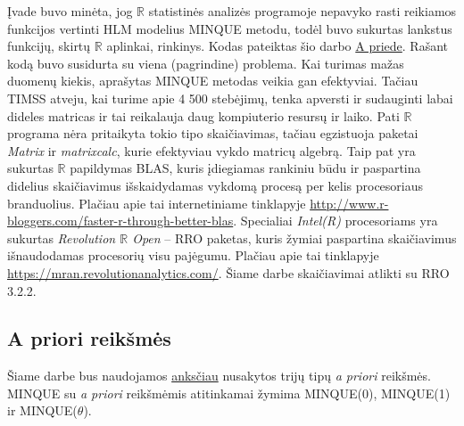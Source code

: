 \documentclass[11pt,a4paper]{article}
\newcommand{\R}{{\mathbb R}}
\begin{document}
\indent Įvade  buvo minėta, jog $\R$ statistinės analizės programoje nepavyko rasti reikiamos funkcijos vertinti HLM modelius MINQUE metodu, todėl buvo sukurtas lankstus funkcijų, skirtų $\R$ aplinkai, rinkinys. Kodas pateiktas šio darbo \hyperlink{appendixa}{A priede}. Rašant kodą buvo susidurta su viena (pagrindine) problema. Kai turimas mažas duomenų kiekis, aprašytas MINQUE metodas veikia gan efektyviai. Tačiau TIMSS atveju, kai turime apie 4 500 stebėjimų, tenka apversti ir sudauginti labai dideles matricas ir tai reikalauja daug kompiuterio resursų ir laiko. Pati $\R$ programa nėra pritaikyta tokio tipo skaičiavimas, tačiau egzistuoja paketai \textit{Matrix} ir \textit{matrixcalc}, kurie efektyviau vykdo matricų algebrą. Taip pat yra sukurtas $\R$ papildymas BLAS, kuris įdiegiamas rankiniu būdu ir paspartina didelius skaičiavimus išskaidydamas vykdomą procesą per kelis procesoriaus branduolius. Plačiau apie tai internetiniame tinklapyje \url{http://www.r-bloggers.com/faster-r-through-better-blas}. Specialiai \textit{Intel(R)} procesoriams yra sukurtas \textit{Revolution $\R$ Open} -- RRO paketas, kuris žymiai paspartina skaičiavimus išnaudodamas procesorių visu pajėgumu. Plačiau apie tai tinklapyje \url{https://mran.revolutionanalytics.com/}. Šiame darbe skaičiavimai atlikti su RRO 3.2.2.


\subsection{A priori reikšmės}\label{subsec:apriori}
\indent Šiame darbe bus naudojamos \hyperlink{apriori}{anksčiau} nusakytos trijų tipų \textit{a priori} reikšmės. MINQUE su \textit{a priori} reikšmėmis atitinkamai žymima MINQUE(0), MINQUE(1) ir MINQUE($\theta$).
\end{document}
